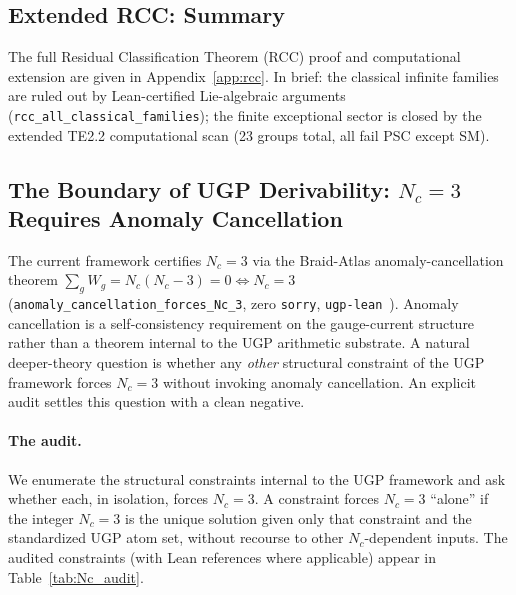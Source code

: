 \documentclass[11pt]{article}
\theoremstyle{remark}
\newcommand{\Nc}{N_c}
\begin{document}
\subsection{Extended RCC: Summary}
\label{subsec:rcc_extended}

The full Residual Classification Theorem (RCC) proof and computational extension are given in Appendix~\ref{app:rcc}.  In brief: the classical infinite families are ruled out by Lean-certified Lie-algebraic arguments (\texttt{rcc\_all\_classical\_families}); the finite exceptional sector is closed by the extended TE2.2 computational scan (23 groups total, all fail PSC except SM).

\subsection{The Boundary of UGP Derivability: $\Nc = 3$ Requires Anomaly Cancellation}
\label{subsec:Nc_boundary}

The current framework certifies $\Nc = 3$ via the Braid-Atlas
anomaly-cancellation theorem
$\sum_g W_g = \Nc(\Nc - 3) = 0 \Leftrightarrow \Nc = 3$
(\texttt{anomaly\_cancellation\_forces\_Nc\_3}, zero \texttt{sorry},
\texttt{ugp-lean}~\cite{ugp-lean}).
Anomaly cancellation is a self-consistency requirement on the gauge-current
structure rather than a theorem internal to the UGP arithmetic substrate.
A natural deeper-theory question is whether any \emph{other} structural
constraint of the UGP framework forces $\Nc = 3$ without invoking anomaly
cancellation.  An explicit audit settles this question with a clean negative.

\paragraph{The audit.}
We enumerate the structural constraints internal to the UGP framework and ask
whether each, in isolation, forces $\Nc = 3$.  A constraint forces $\Nc = 3$
``alone'' if the integer $\Nc = 3$ is the unique solution given only that
constraint and the standardized UGP atom set, without recourse to other
$\Nc$-dependent inputs.  The audited constraints (with Lean references where
applicable) appear in Table~\ref{tab:Nc_audit}.
\end{document}
